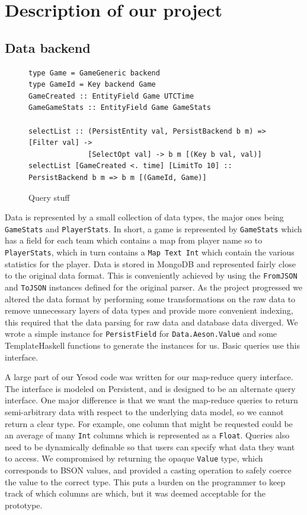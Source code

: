 \documentclass[letterpaper,twocolumn,9pt]{article}
\newcommand{\code}[1]{\texttt{#1}}
\begin{document}
\section{Description of our project}
\label{package}

\subsection{Data backend}

\begin{figure}[t]
\begin{verbatim}
type Game = GameGeneric backend
type GameId = Key backend Game
GameCreated :: EntityField Game UTCTime
GameGameStats :: EntityField Game GameStats

selectList :: (PersistEntity val, PersistBackend b m) => [Filter val] ->
              [SelectOpt val] -> b m [(Key b val, val)]
selectList [GameCreated <. time] [LimitTo 10] :: PersistBackend b m => b m [(GameId, Game)]
\end{verbatim}
    \caption{Query stuff}
    \label{querycode}
\end{figure}

Data is represented by a small collection of data types, the major ones being \code{GameStats} and \code{PlayerStats}.  In short, a game is represented by \code{GameStats} which has a field for each team which contains a map from player name so to \code{PlayerStats}, which in turn contains a \code{Map Text Int} which contain the various statistics for the player.  Data is stored in MongoDB and represented fairly close to the original data format.  This is conveniently achieved by using the \code{FromJSON} and \code{ToJSON} instances defined for the original parser.  As the project progressed we altered the data format by performing some transformations on the raw data to remove unnecessary layers of data types and provide more convenient indexing, this required that the data parsing for raw data and database data diverged.  We wrote a simple instance for \code{PersistField} for \code{Data.Aeson.Value} and some TemplateHaskell functions to generate the instances for us.  Basic queries use this interface.

A large part of our Yesod code was written for our map-reduce query interface.  The interface is modeled on Persistent, and is designed to be an alternate query interface.  One major difference is that we want the map-reduce queries to return semi-arbitrary data with respect to the underlying data model, so we cannot return a clear type.  For example, one column that might be requested could be an average of many \code{Int} columns which is represented as a \code{Float}.  Queries also need to be dynamically definable so that users can specify what data they want to access.  We compromised by returning the opaque \code{Value} type, which corresponds to BSON values, and provided a casting operation to safely coerce the value to the correct type.  This puts a burden on the programmer to keep track of which columns are which, but it was deemed acceptable for the prototype.
\end{document}

